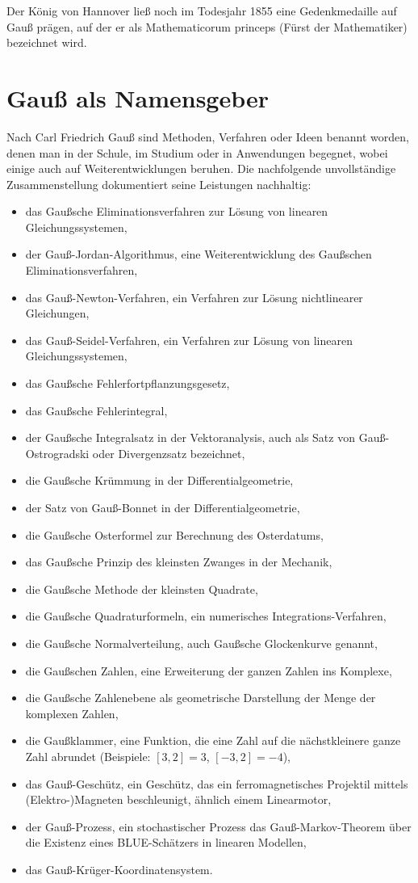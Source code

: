 \documentclass[10pt]{article}
\begin{document}
Der König von Hannover ließ noch im Todesjahr 1855 eine Gedenkmedaille auf
Gauß prägen, auf der er als {\glqq}Mathematicorum princeps{\grqq} (Fürst der
Mathematiker) bezeichnet wird.

\section{Gauß als Namensgeber}

Nach Carl Friedrich Gauß sind Methoden, Verfahren oder Ideen benannt worden,
denen man in der Schule, im Studium oder in Anwendungen begegnet, wobei einige
auch auf Weiterentwicklungen beruhen. Die nachfolgende unvollständige
Zusammenstellung dokumentiert seine Leistungen nachhaltig:  
\begin{itemize}\setlength{\itemsep}{0pt}
\item das Gaußsche Eliminationsverfahren zur Lösung von linearen
  Gleichungssystemen,
\item der Gauß-Jordan-Algorithmus, eine Weiterentwicklung des Gaußschen
  Eliminationsverfahren,
\item das Gauß-Newton-Verfahren, ein Verfahren zur Lösung nichtlinearer
  Gleichungen,
\item das Gauß-Seidel-Verfahren, ein Verfahren zur Lösung von linearen
  Gleichungssystemen,
\item das Gaußsche Fehlerfortpflanzungsgesetz,
\item das Gaußsche Fehlerintegral,
\item der Gaußsche Integralsatz in der Vektoranalysis, auch als Satz von
  Gauß-Ostrogradski oder Divergenzsatz bezeichnet,
\item die Gaußsche Krümmung in der Differentialgeometrie,
\item der Satz von Gauß-Bonnet in der Differentialgeometrie,
\item die Gaußsche Osterformel zur Berechnung des Osterdatums,
\item das Gaußsche Prinzip des kleinsten Zwanges in der Mechanik,
\item die Gaußsche Methode der kleinsten Quadrate,
\item die Gaußsche Quadraturformeln, ein numerisches Integrations-Verfahren,
\item die Gaußsche Normalverteilung, auch Gaußsche Glockenkurve genannt,
\item die Gaußschen Zahlen, eine Erweiterung der ganzen Zahlen ins Komplexe,
\item die Gaußsche Zahlenebene als geometrische Darstellung der Menge der
  komplexen Zahlen,
\item die Gaußklammer, eine Funktion, die eine Zahl auf die nächstkleinere
  ganze Zahl abrundet (Beispiele: $[3,2] = 3$, $[-3,2] = -4$),
\item das Gauß-Geschütz, ein Geschütz, das ein ferromagnetisches Projektil
  mittels \mbox{(Elektro-)}\-Magneten beschleunigt, ähnlich einem Linearmotor,
\item der Gauß-Prozess, ein stochastischer Prozess das Gauß-Markov-Theorem
  über die Existenz eines BLUE-Schätzers in linearen Modellen,
\item das Gauß-Krüger-Koordinatensystem.
\end{itemize}
\end{document}
